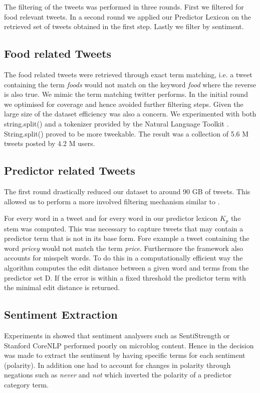 The filtering of the tweets was performed in three rounds. First we filtered for food relevant tweets. In a second round we applied our Predictor Lexicon on the retrieved set of tweets obtained in the first step. Lastly we filter by sentiment. 

\subsection{Food related Tweets} 

The food related tweets were retrieved through exact term matching, i.e. a tweet containing the term \emph{foods} would not match on the keyword \emph {food} where the reverse is also true. We mimic the term matching twitter performs. In the initial round we optimised for coverage and hence avoided further filtering steps. Given the large size of the dataset efficiency was also a concern. We experimented with both string.split() and a tokenizer provided by the Natural Language Toolkit \cite{Loper2002}. String.split() proved to be more tweekable. The result was a collection of 5.6 M tweets posted by 4.2 M users. 

\subsection{Predictor related Tweets}

The first round  drastically reduced our dataset to around 90 GB of tweets. This allowed us to perform a more involved filtering mechanism similar to \cite{hum14}. 

For every word in a tweet and for every word in our predictor lexicon $K_p$ the stem was computed. This was necessary to capture tweets that may contain a predictor term that is not in its base form. Fore example a tweet containing the word \emph{pricey} would not match the term \emph{price}. Furthermore the framework also accounts for misspelt words. To do this in a computationally efficient way the algorithm computes the edit distance between a given word and terms from the predictor set D. If the error is within a fixed threshold the predictor term with the minimal edit distance is returned. 

\subsection{Sentiment Extraction}

Experiments in \cite{hum14} showed that sentiment analysers such as SentiStrength \cite{sent10} or Stanford CoreNLP \cite{stanford2011} performed  poorly on microblog content. Hence in \cite{hum14} the decision was made to extract the sentiment by having specific terms for each sentiment (polarity). In addition one had to account for changes in polarity through negations such as \emph{never} and \emph{not} which inverted the polarity of a predictor category term. 

